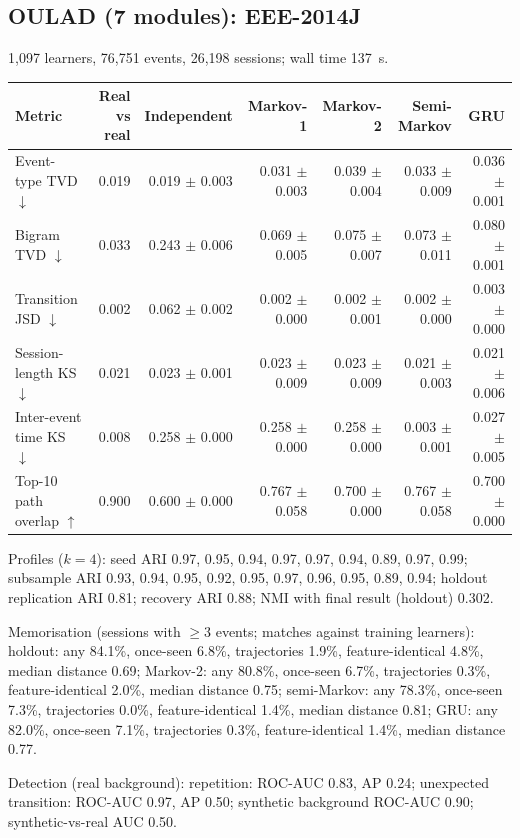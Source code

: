 \subsection*{OULAD (7 modules): EEE-2014J}
1{,}097 learners, 76{,}751 events, 26{,}198 sessions; wall time 137~s.

\begin{tabular}{l r r r r r r }
\toprule
Metric & Real vs real & Independent & Markov-1 & Markov-2 & Semi-Markov & GRU \\
\midrule
Event-type TVD $\downarrow$ & 0.019 & 0.019 $\pm$ 0.003 & 0.031 $\pm$ 0.003 & 0.039 $\pm$ 0.004 & 0.033 $\pm$ 0.009 & 0.036 $\pm$ 0.001 \\
Bigram TVD $\downarrow$ & 0.033 & 0.243 $\pm$ 0.006 & 0.069 $\pm$ 0.005 & 0.075 $\pm$ 0.007 & 0.073 $\pm$ 0.011 & 0.080 $\pm$ 0.001 \\
Transition JSD $\downarrow$ & 0.002 & 0.062 $\pm$ 0.002 & 0.002 $\pm$ 0.000 & 0.002 $\pm$ 0.001 & 0.002 $\pm$ 0.000 & 0.003 $\pm$ 0.000 \\
Session-length KS $\downarrow$ & 0.021 & 0.023 $\pm$ 0.001 & 0.023 $\pm$ 0.009 & 0.023 $\pm$ 0.009 & 0.021 $\pm$ 0.003 & 0.021 $\pm$ 0.006 \\
Inter-event time KS $\downarrow$ & 0.008 & 0.258 $\pm$ 0.000 & 0.258 $\pm$ 0.000 & 0.258 $\pm$ 0.000 & 0.003 $\pm$ 0.001 & 0.027 $\pm$ 0.005 \\
Top-10 path overlap $\uparrow$ & 0.900 & 0.600 $\pm$ 0.000 & 0.767 $\pm$ 0.058 & 0.700 $\pm$ 0.000 & 0.767 $\pm$ 0.058 & 0.700 $\pm$ 0.000 \\
\bottomrule
\end{tabular}

Profiles ($k=4$): seed ARI 0.97, 0.95, 0.94, 0.97, 0.97, 0.94, 0.89, 0.97, 0.99; subsample ARI 0.93, 0.94, 0.95, 0.92, 0.95, 0.97, 0.96, 0.95, 0.89, 0.94; holdout replication ARI 0.81; recovery ARI 0.88; NMI with final result (holdout) 0.302.

Memorisation (sessions with $\geq$3 events; matches against training learners): holdout: any 84.1\%, once-seen 6.8\%, trajectories 1.9\%, feature-identical 4.8\%, median distance 0.69; Markov-2: any 80.8\%, once-seen 6.7\%, trajectories 0.3\%, feature-identical 2.0\%, median distance 0.75; semi-Markov: any 78.3\%, once-seen 7.3\%, trajectories 0.0\%, feature-identical 1.4\%, median distance 0.81; GRU: any 82.0\%, once-seen 7.1\%, trajectories 0.3\%, feature-identical 1.4\%, median distance 0.77.

Detection (real background): repetition: ROC-AUC 0.83, AP 0.24; unexpected transition: ROC-AUC 0.97, AP 0.50; synthetic background ROC-AUC 0.90; synthetic-vs-real AUC 0.50.

